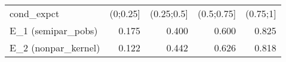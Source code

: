 \begin{table}[ht]
\centering
\begin{tabular}{lrrrr}
 cond\_expct & (0;0.25] & (0.25;0.5] & (0.5;0.75] & (0.75;1] \\ 
 E\_1 (semipar\_pobs) & 0.175 & 0.400 & 0.600 & 0.825 \\ 
  E\_2 (nonpar\_kernel) & 0.122 & 0.442 & 0.626 & 0.818 \\ 
  \end{tabular}
\end{table}
